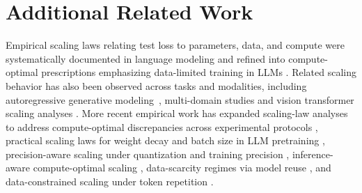 \documentclass[11pt]{article}
\theoremstyle{plain}
\theoremstyle{definition}
\theoremstyle{remark}
\newcommand{\JSCheck}[1]{#1}
\begin{document}


 
%



\newpage
\appendix



\newcommand{\weff}{\mathbf{w}_{\mathrm{eff}}}


\section{Additional Related Work}\label{appendix:AddRWork}
Empirical scaling laws relating test loss to parameters, data, and compute were systematically documented in language modeling \citep{Kaplan2020ScalingLaws} and refined into compute-optimal prescriptions emphasizing data-limited training in LLMs \citep{Hoffmann2022Chinchilla}. Related scaling behavior has also been observed across tasks and modalities, including \JSCheck{autoregressive generative modeling~\citep{henighan2020scaling}}, multi-domain studies \citep{Hestness2017PredictableScaling} and vision transformer scaling analyses \citep{Zhai2022ScalingViT}. More recent empirical work has expanded scaling-law analyses to address compute-optimal discrepancies across experimental protocols \citep{Porian2024ResolvingDiscrepancies}, practical scaling laws for weight decay and batch size in LLM pretraining \citep{bergsma2025powerlines}, precision-aware scaling under quantization and training precision \citep{Kumar2025ScalingPrecision}, inference-aware compute-optimal scaling \citep{Sardana2024BeyondChinchillaOptimal}, data-scarcity regimes via model reuse \citep{Wang2023DataEfficientScaling}, and data-constrained scaling under token repetition \citep{Muennighoff2025ScalingDataConstrained}.
\end{document}
